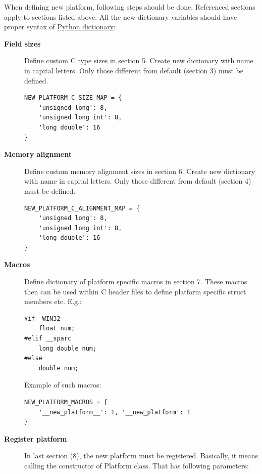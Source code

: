 \documentclass[A4paper,10pt,english]{sphinxmanual}
\begin{document}
When defining new platform, following steps should be done. Referenced sections apply to  sections listed above. All the new dictionary variables should have proper syntax of \href{http://docs.python.org/release/3.1.3/tutorial/datastructures.html\#dictionaries}{Python dictionary}:
\begin{description}
\item[{\textbf{Field sizes}}] \leavevmode
Define custom C type sizes in section 5. Create new dictionary with name in capital letters. Only those different from default (section 3) must be defined.

\begin{Verbatim}[commandchars=\\\{\}]
NEW_PLATFORM_C_SIZE_MAP = {
    'unsigned long': 8,
    'unsigned long int': 8,
    'long double': 16
}
\end{Verbatim}

\item[{\textbf{Memory alignment}}] \leavevmode
Define custom memory alignment sizes in section 6. Create new dictionary with name in capital letters. Only those different from default (section 4) must be defined.

\begin{Verbatim}[commandchars=\\\{\}]
NEW_PLATFORM_C_ALIGNMENT_MAP = {
    'unsigned long': 8,
    'unsigned long int': 8,
    'long double': 16
}
\end{Verbatim}

\item[{\textbf{Macros}}] \leavevmode
Define dictionary of platform specific macros in section 7. These macros then can be used within C header files to define platform specific struct members etc. E.g.:

\begin{Verbatim}[commandchars=\\\{\}]
#if _WIN32
    float num;
#elif __sparc
    long double num;
#else
    double num;
\end{Verbatim}


Example of such macros:

\begin{Verbatim}[commandchars=\\\{\}]
NEW_PLATFORM_MACROS = {
    '__new_platform__': 1, '__new_platform': 1
}
\end{Verbatim}

\item[{\textbf{Register platform}}] \leavevmode
In last section (8), the new platform must be registered. Basically, it means calling the constructor of Platform class. That has following parameters:


\end{description}
\end{document}
